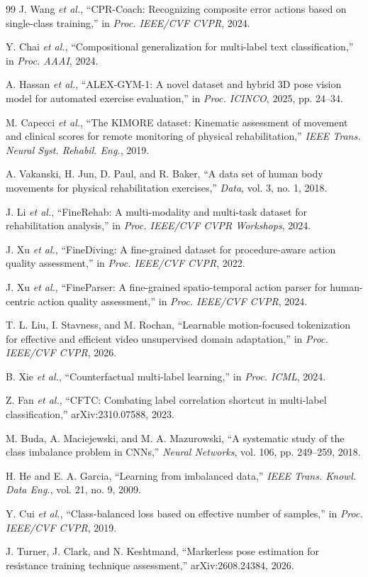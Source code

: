 \documentclass[conference,a4paper]{IEEEtran}
\begin{document}
\begin{thebibliography}{99}
\footnotesize
{} J. Wang \emph{et al.}, ``CPR-Coach: Recognizing composite
error actions based on single-class training,'' in \emph{Proc. IEEE/CVF CVPR},
2024.

 Y. Chai \emph{et al.}, ``Compositional
generalization for multi-label text classification,'' in \emph{Proc. AAAI},
2024.

 A. Hassan \emph{et al.}, ``ALEX-GYM-1: A novel
dataset and hybrid 3D pose vision model for automated exercise evaluation,''
in \emph{Proc. ICINCO}, 2025, pp. 24--34.

 M. Capecci \emph{et al.}, ``The KIMORE dataset:
Kinematic assessment of movement and clinical scores for remote monitoring of
physical rehabilitation,'' \emph{IEEE Trans. Neural Syst. Rehabil. Eng.}, 2019.

 A. Vakanski, H. Jun, D. Paul, and R. Baker, ``A
data set of human body movements for physical rehabilitation exercises,''
\emph{Data}, vol. 3, no. 1, 2018.

 J. Li \emph{et al.}, ``FineRehab: A multi-modality and
multi-task dataset for rehabilitation analysis,'' in \emph{Proc. IEEE/CVF CVPR
Workshops}, 2024.

 J. Xu \emph{et al.}, ``FineDiving: A fine-grained
dataset for procedure-aware action quality assessment,'' in \emph{Proc. IEEE/CVF
CVPR}, 2022.

 J. Xu \emph{et al.}, ``FineParser: A fine-grained
spatio-temporal action parser for human-centric action quality assessment,'' in
\emph{Proc. IEEE/CVF CVPR}, 2024.

 T. L. Liu, I. Stavness, and M. Rochan, ``Learnable
motion-focused tokenization for effective and efficient video unsupervised
domain adaptation,'' in \emph{Proc. IEEE/CVF CVPR}, 2026.

 B. Xie \emph{et al.}, ``Counterfactual
multi-label learning,'' in \emph{Proc. ICML}, 2024.

 Z. Fan \emph{et al.}, ``CFTC: Combating label correlation
shortcut in multi-label classification,'' arXiv:2310.07588, 2023.

 M. Buda, A. Maciejewski, and M. A. Mazurowski,
``A systematic study of the class imbalance problem in CNNs,'' \emph{Neural
Networks}, vol. 106, pp. 249--259, 2018.

 H. He and E. A. Garcia, ``Learning from imbalanced
data,'' \emph{IEEE Trans. Knowl. Data Eng.}, vol. 21, no. 9, 2009.

 Y. Cui \emph{et al.}, ``Class-balanced loss
based on effective number of samples,'' in \emph{Proc. IEEE/CVF CVPR}, 2019.

 J. Turner, J. Clark, and N. Keshtmand,
``Markerless pose estimation for resistance training technique assessment,''
arXiv:2608.24384, 2026.

\end{thebibliography}
\end{document}
